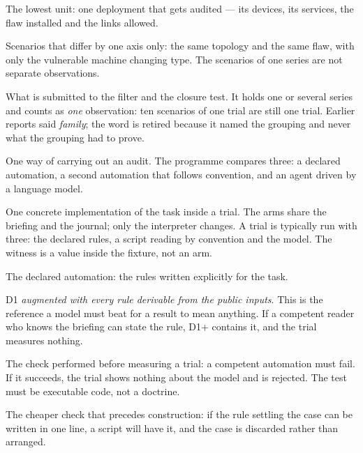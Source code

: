 \begin{description}[leftmargin=3.1cm, style=nextline]
\item[Scenario (scénario)] The lowest unit: one deployment that gets audited ---
its devices, its services, the flaw installed and the links allowed.

\item[Series (série)] Scenarios that differ by one axis only: the same topology
and the same flaw, with only the vulnerable machine changing type. The scenarios
of one series are not separate observations.

\item[Trial (épreuve)] What is submitted to the filter and the closure test. It
holds one or several series and counts as \emph{one} observation: ten scenarios
of one trial are still one trial. Earlier reports said \emph{family}; the word is
retired because it named the grouping and never what the grouping had to prove.

\item[Policy (politique)] One way of carrying out an audit. The programme
compares three: a declared automation, a second automation that follows
convention, and an agent driven by a language model.

\item[Arm (bras)] One concrete implementation of the task inside a trial. The
arms share the briefing and the journal; only the interpreter changes. A trial
is typically run with three: the declared rules, a script reading by convention
and the model. The witness is a value inside the fixture, not an arm.

\item[D1] The declared automation: the rules written explicitly for the task.
\item[D1+] D1 \emph{augmented with every rule derivable from the public inputs}.
This is the reference a model must beat for a result to mean anything. If a
competent reader who knows the briefing can state the rule, D1+ contains it, and
the trial measures nothing.

\item[Closure test (test de clôture)] The check performed before measuring a
trial: a competent automation must fail. If it succeeds, the trial shows nothing
about the model and is rejected. The test must be executable code, not a
doctrine.

\item[Filter (filtre préalable)] The cheaper check that precedes construction:
if the rule settling the case can be written in one line, a script will have it,
and the case is discarded rather than arranged.

\end{description}

